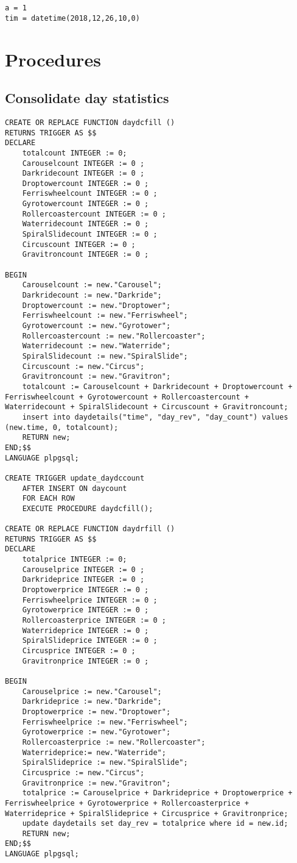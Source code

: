 \begin{verbatim}
a = 1
tim = datetime(2018,12,26,10,0)
\end{verbatim}

\section{Procedures}
\subsection{Consolidate day statistics}
\begin{verbatim}
CREATE OR REPLACE FUNCTION daydcfill ()
RETURNS TRIGGER AS $$
DECLARE
    totalcount INTEGER := 0;
    Carouselcount INTEGER := 0 ;
    Darkridecount INTEGER := 0 ;
    Droptowercount INTEGER := 0 ;
    Ferriswheelcount INTEGER := 0 ;
    Gyrotowercount INTEGER := 0 ;
    Rollercoastercount INTEGER := 0 ;
    Waterridecount INTEGER := 0 ;
    SpiralSlidecount INTEGER := 0 ;
    Circuscount INTEGER := 0 ;
    Gravitroncount INTEGER := 0 ;

BEGIN
    Carouselcount := new."Carousel";
    Darkridecount := new."Darkride";
    Droptowercount := new."Droptower";
    Ferriswheelcount := new."Ferriswheel";
    Gyrotowercount := new."Gyrotower";
    Rollercoastercount := new."Rollercoaster";
    Waterridecount := new."Waterride";
    SpiralSlidecount := new."SpiralSlide";
    Circuscount := new."Circus";
    Gravitroncount := new."Gravitron";
    totalcount := Carouselcount + Darkridecount + Droptowercount + Ferriswheelcount + Gyrotowercount + Rollercoastercount + Waterridecount + SpiralSlidecount + Circuscount + Gravitroncount;
    insert into daydetails("time", "day_rev", "day_count") values (new.time, 0, totalcount);
    RETURN new;
END;$$
LANGUAGE plpgsql;

CREATE TRIGGER update_daydccount
    AFTER INSERT ON daycount
    FOR EACH ROW
    EXECUTE PROCEDURE daydcfill();

CREATE OR REPLACE FUNCTION daydrfill ()
RETURNS TRIGGER AS $$
DECLARE
    totalprice INTEGER := 0;
    Carouselprice INTEGER := 0 ;
    Darkrideprice INTEGER := 0 ;
    Droptowerprice INTEGER := 0 ;
    Ferriswheelprice INTEGER := 0 ;
    Gyrotowerprice INTEGER := 0 ;
    Rollercoasterprice INTEGER := 0 ;
    Waterrideprice INTEGER := 0 ;
    SpiralSlideprice INTEGER := 0 ;
    Circusprice INTEGER := 0 ;
    Gravitronprice INTEGER := 0 ;

BEGIN
    Carouselprice := new."Carousel";
    Darkrideprice := new."Darkride";
    Droptowerprice := new."Droptower";
    Ferriswheelprice := new."Ferriswheel";
    Gyrotowerprice := new."Gyrotower";
    Rollercoasterprice := new."Rollercoaster";
    Waterrideprice:= new."Waterride";
    SpiralSlideprice := new."SpiralSlide";
    Circusprice := new."Circus";
    Gravitronprice := new."Gravitron";
    totalprice := Carouselprice + Darkrideprice + Droptowerprice + Ferriswheelprice + Gyrotowerprice + Rollercoasterprice + Waterrideprice + SpiralSlideprice + Circusprice + Gravitronprice;
    update daydetails set day_rev = totalprice where id = new.id;
    RETURN new;
END;$$
LANGUAGE plpgsql;


\end{verbatim}
